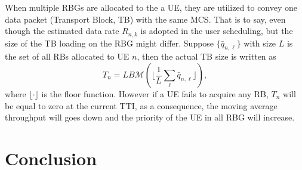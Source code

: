 \documentclass[conference,compsocconf]{IEEEtran}
\begin{document}
When multiple RBGs are allocated to the a UE, they are utilized to convey one data packet (Transport Block, TB) with the same MCS. That is to say, even though the estimated data rate $R_{n,k}$ is adopted in the user scheduling, but the size of the TB loading on the RBG might differ. Suppose $\{\bar{q}_{n,\ell}\}$ with size $L$ is the set of all RBs allocated to UE $n$, then the actual TB size is written as
\begin{equation}
T_n=LB\mathcal{M}\left(\bigg\lfloor\frac{1}{L}\sum_{\ell}\bar{q}_{n,\ell}\bigg\rfloor\right),
\end{equation}
where $\lfloor\cdot\rfloor$ is the floor function. However if a UE fails to acquire any RB, $T_n$ will be equal to zero at the current TTI, as a consequence, the moving average throughput will goes down and the priority of the UE in all RBG will increase.

\section{Conclusion}
    


\end{document}
